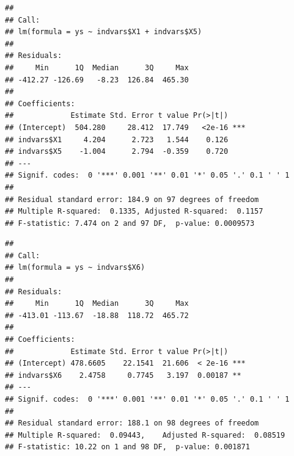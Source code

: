 \documentclass[
]{book}
\newenvironment{Shaded}{\begin{snugshade}}{\end{snugshade}}
\newcommand{\FunctionTok}[1]{\textcolor[rgb]{0.13,0.29,0.53}{\textbf{#1}}}
\newcommand{\NormalTok}[1]{#1}
\newcommand{\OtherTok}[1]{\textcolor[rgb]{0.56,0.35,0.01}{#1}}
\newcommand{\SpecialCharTok}[1]{\textcolor[rgb]{0.81,0.36,0.00}{\textbf{#1}}}
\begin{document}
\begin{verbatim}
## 
## Call:
## lm(formula = ys ~ indvars$X1 + indvars$X5)
## 
## Residuals:
##     Min      1Q  Median      3Q     Max 
## -412.27 -126.69   -8.23  126.84  465.30 
## 
## Coefficients:
##             Estimate Std. Error t value Pr(>|t|)    
## (Intercept)  504.280     28.412  17.749   <2e-16 ***
## indvars$X1     4.204      2.723   1.544    0.126    
## indvars$X5    -1.004      2.794  -0.359    0.720    
## ---
## Signif. codes:  0 '***' 0.001 '**' 0.01 '*' 0.05 '.' 0.1 ' ' 1
## 
## Residual standard error: 184.9 on 97 degrees of freedom
## Multiple R-squared:  0.1335, Adjusted R-squared:  0.1157 
## F-statistic: 7.474 on 2 and 97 DF,  p-value: 0.0009573
\end{verbatim}

\begin{Shaded}
\end{Shaded}

\begin{verbatim}
## 
## Call:
## lm(formula = ys ~ indvars$X6)
## 
## Residuals:
##     Min      1Q  Median      3Q     Max 
## -413.01 -113.67  -18.88  118.72  465.72 
## 
## Coefficients:
##             Estimate Std. Error t value Pr(>|t|)    
## (Intercept) 478.6605    22.1541  21.606  < 2e-16 ***
## indvars$X6    2.4758     0.7745   3.197  0.00187 ** 
## ---
## Signif. codes:  0 '***' 0.001 '**' 0.01 '*' 0.05 '.' 0.1 ' ' 1
## 
## Residual standard error: 188.1 on 98 degrees of freedom
## Multiple R-squared:  0.09443,    Adjusted R-squared:  0.08519 
## F-statistic: 10.22 on 1 and 98 DF,  p-value: 0.001871
\end{verbatim}

\begin{Shaded}
\end{Shaded}
\end{document}
